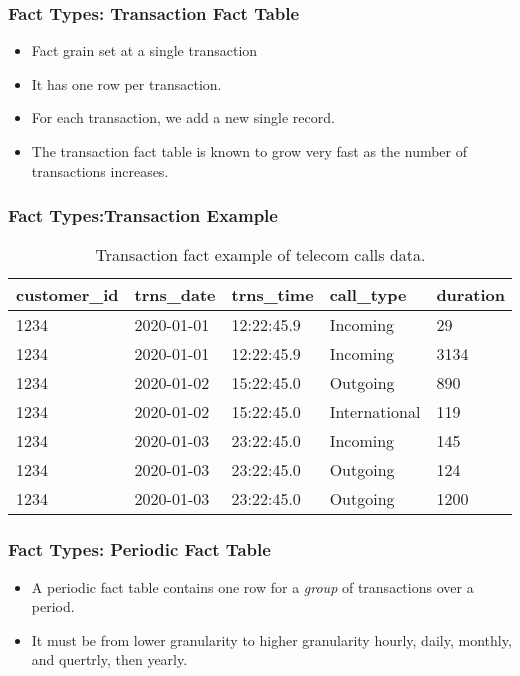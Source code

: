 \begin{frame}
	\frametitle{Fact Types: Transaction Fact Table}
	\begin{itemize}
        \item Fact grain set at a single transaction
        \item It has one row per transaction.
        \item For each transaction, we add a new single record.
        \item The transaction fact table is known to grow very fast as the number of transactions increases.
        
	\end{itemize}
    
\end{frame}
\begin{frame}
	\frametitle{Fact Types:Transaction Example}
 \begin{table}
    		\begin{tabular}{| l | l | l|l|l|}
           			\hline
                      customer\_id & trns\_date & trns\_time & call\_type & duration\\
                  	  \hline
                      1234 & 2020-01-01 & 12:22:45.9 & Incoming & 29\\
                      1234 & 2020-01-01 & 12:22:45.9 & Incoming & 3134\\
                      1234 & 2020-01-02 & 15:22:45.0 & Outgoing & 890 \\
                      1234 & 2020-01-02 & 15:22:45.0 & International& 119 \\
                      1234 & 2020-01-03 & 23:22:45.0 & Incoming & 145 \\
                      1234 & 2020-01-03 & 23:22:45.0 & Outgoing & 124 \\
                      1234 & 2020-01-03 & 23:22:45.0 & Outgoing & 1200\\
    			\hline
    		\end{tabular}
    	\caption{Transaction fact example of telecom calls data.}
    \end{table}
\end{frame}
\begin{frame}
	\frametitle{Fact Types: Periodic Fact Table}
	\begin{itemize}
        \item A periodic fact table contains one row for a \textit{group} of transactions over a period. 
		\item It must be from lower granularity to higher granularity hourly, daily, monthly, and quertrly, then yearly.
	\end{itemize}
\end{frame}
